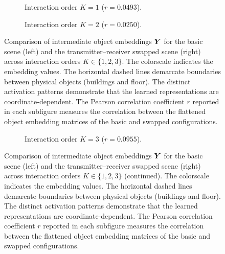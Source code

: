 \begin{figure}
  \ContinuedFloat*
  \centering
  \begin{subfigure}[b]{\contentwidth}
    \centering
    \caption{Interaction order $K=1$ ($r = 0.0493$).}
  \end{subfigure}

  \begin{subfigure}[b]{\contentwidth}
    \centering
    \caption{Interaction order $K=2$ ($r = 0.0250$).}
  \end{subfigure}
  \caption{Comparison of intermediate object embeddings $\boldsymbol{Y}$ for the basic scene (left) and the transmitter--receiver swapped scene (right) across interaction orders $K \in \{1, 2, 3\}$. The colorscale indicates the embedding values. The horizontal dashed lines demarcate boundaries between physical objects (buildings and floor). The distinct activation patterns demonstrate that the learned representations are coordinate-dependent. The Pearson correlation coefficient $r$ reported in each subfigure measures the correlation between the flattened object embedding matrices of the basic and swapped configurations.}
\end{figure}

\begin{figure}
  \ContinuedFloat
  \centering
  \begin{subfigure}[b]{\contentwidth}
    \centering
    \caption{Interaction order $K=3$ ($r = 0.0955$).}
  \end{subfigure}
  \caption{Comparison of intermediate object embeddings $\boldsymbol{Y}$ for the basic scene (left) and the transmitter--receiver swapped scene (right) across interaction orders $K \in \{1, 2, 3\}$ (continued). The colorscale indicates the embedding values. The horizontal dashed lines demarcate boundaries between physical objects (buildings and floor). The distinct activation patterns demonstrate that the learned representations are coordinate-dependent. The Pearson correlation coefficient $r$ reported in each subfigure measures the correlation between the flattened object embedding matrices of the basic and swapped configurations.}
\end{figure}

